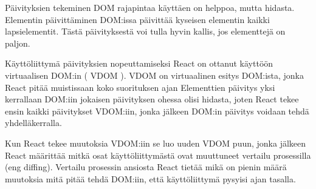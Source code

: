 Päivityksien tekeminen DOM rajapintaa käyttäen on helppoa, mutta hidasta.
Elementin päivittäminen DOM:issa päivittää kyseisen elementin kaikki lapsielementit. 
Tästä päivityksestä voi tulla hyvin kallis, jos elementtejä on paljon.
\bigskip




Käyttöliittymä päivityksien nopeuttamiseksi React on ottanut käyttöön virtuaalisen DOM:in ( VDOM ).
VDOM on virtuaalinen esitys DOM:ista, jonka React pitää muistissaan koko suorituksen ajan
Elementtien päivitys yksi kerrallaan DOM:iin jokaisen päivityksen ohessa olisi hidasta,
joten React tekee ensin kaikki päivitykset VDOM:iin, jonka jälkeen DOM:in päivitys voidaan tehdä yhdelläkerralla.
%
%
\medskip

Kun React tekee muutoksia VDOM:iin se luo uuden VDOM puun, jonka jälkeen
React määrittää mitkä osat käyttöliittymästä ovat muuttuneet vertailu prosessilla (eng diffing).
Vertailu prosessin ansiosta React tietää mikä on pienin määrä muutoksia mitä pitää tehdä DOM:iin, 
että käyttöliittymä pysyisi ajan tasalla.
\medskip



